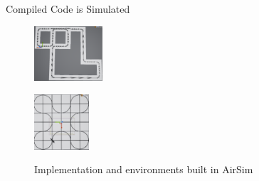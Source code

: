 \documentclass[slidestop,aspectratio=169]{beamer}
\theoremstyle{plain}
\theoremstyle{definition}
\theoremstyle{remark}
\begin{document}
\begin{frame}[t]{Compiled Code is Simulated}
\begin{figure}[tb]
\begin{minipage}[b]{1in}\centering
\includegraphics[width=1in]{graphics/screen2.png}
\label{fig:turns}\end{minipage}
\begin{minipage}[b]{1in}\centering
\includegraphics[width=0.8in]{graphics/screen3.png}
\label{fig:clover}\end{minipage}
\caption{Implementation and environments built in AirSim}
\label{fig:patrol-plan}
\end{figure}

\end{frame}
\end{document}
